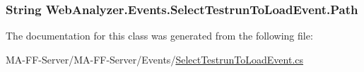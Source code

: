 \subsubsection[{Path}]{\setlength{\rightskip}{0pt plus 5cm}String Web\+Analyzer.\+Events.\+Select\+Testrun\+To\+Load\+Event.\+Path\hspace{0.3cm}{\ttfamily [get]}}\label{class_web_analyzer_1_1_events_1_1_select_testrun_to_load_event_aa27c59c738823f2dce810a0b8f89259d}


The documentation for this class was generated from the following file\+:\begin{DoxyCompactItemize}
\item 
M\+A-\/\+F\+F-\/\+Server/\+M\+A-\/\+F\+F-\/\+Server/\+Events/\hyperlink{_select_testrun_to_load_event_8cs}{Select\+Testrun\+To\+Load\+Event.\+cs}\end{DoxyCompactItemize}
